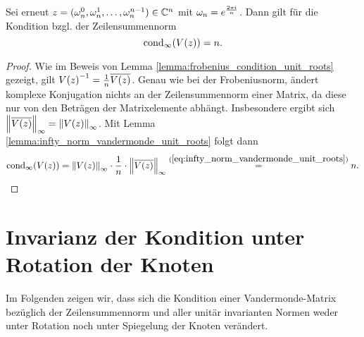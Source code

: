 \begin{lemma}
    Sei erneut $z = (\wn^0, \wn^1, \dots, \wn^{n-1}) \in \Cn$ mit
    $\wn = e^{\frac{2 \pi i}{n}}$.
    Dann gilt für die Kondition bzgl. der Zeilensummennorm
    \[
        \cond[\infty]{\Vand{z}} = n.
    \]
\end{lemma}
\begin{proof}
    Wie im Beweis von Lemma \ref{lemma:frobenius_condition_unit_roots} gezeigt, gilt
    $ \Vand{z}^{-1} = \frac{1}{n} \overline{\Vand{z}} $.
    Genau wie bei der Frobeniusnorm, ändert komplexe Konjugation
    nichts an der Zeilensummennorm einer Matrix, da diese nur von den Beträgen
    der Matrixelemente abhängt. Insbesondere ergibt
    sich $\norm{\overline{\Vand{z}}}_\infty = \norm{\Vand{z}}_\infty$.
    Mit Lemma \ref{lemma:infty_norm_vandermonde_unit_roots} folgt dann
    \[
        \cond[\infty]{\Vand{z}}
        = \norm{\Vand{z}}_\infty \cdot \frac{1}{n} \cdot \norm{\overline{\Vand{z}}}_\infty
        \overset{(\ref{eq:infty_norm_vandermonde_unit_roots})}= n.
    \]
\end{proof}


\section{Invarianz der Kondition unter Rotation der Knoten}

Im Folgenden zeigen wir, dass sich die Kondition einer Vandermonde-Matrix
bezüglich der Zeilensummennorm und aller unitär invarianten Normen weder unter
Rotation noch unter Spiegelung der Knoten verändert.

